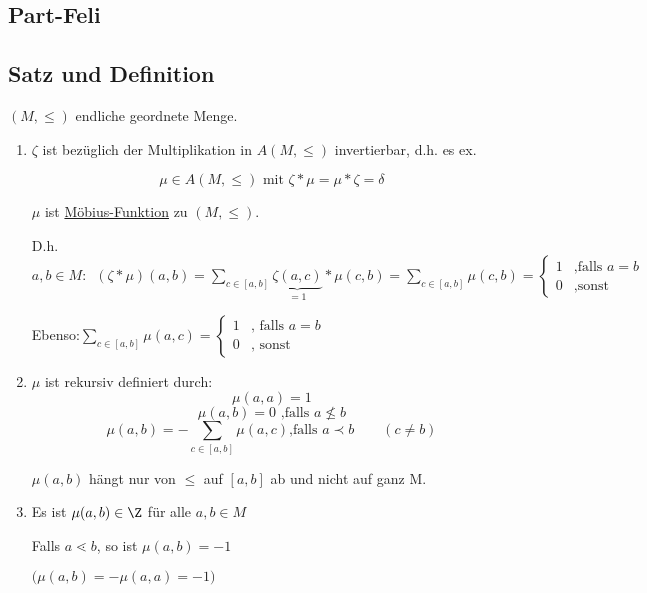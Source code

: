 \subsection{Part-Feli}

\subsection{Satz und Definition}
$(M,\leq)$ endliche geordnete Menge.
\begin{enumerate}
	

\item $\zeta$ ist bezüglich der Multiplikation in $A(M,\leq)$ invertierbar, d.h. es ex.

$$ \mu \in A(M,\leq) \text{ mit } \zeta * \mu = \mu * \zeta = \delta$$

$\mu$ ist \underline{Möbius-Funktion} zu $(M,\leq)$.

D.h. $a,b \in M: \enspace (\zeta * \mu)(a,b) = \sum_{c\in [a,b]} \underbrace{\zeta(a,c)}_{=1}*\mu(c,b) = \sum_{c \in [a,b]}\mu(c,b) =\begin{cases}
1& \text{,falls } a=b\\
0& \text{,sonst}
\end{cases}$

Ebenso:$ \sum_{c \in [a,b]}\mu(a,c)= \begin{cases}
1&\text{, falls }a=b\\
0& \text{, sonst}
\end{cases}$


\item $\mu$ ist rekursiv definiert durch:
$$\mu(a,a) =1$$
$$\mu(a,b) = 0 \text{ ,falls } a\nleq b$$
$$\mu(a,b) = -\sum_{c\in [a,b]}\mu(a,c) \text{,falls } a\prec b \qquad(c\neq b)$$

$\mu(a,b)$ hängt nur von $\leq$ auf $[a,b]$ ab und nicht auf ganz M.

\item Es ist $\mu(a,b) \in \Z$ für alle $a,b \in M$

Falls $a \lessdot b$, so ist $\mu(a,b) = -1$

$\Big(\mu(a,b)=-\mu(a,a)=-1\Big)$
\end{enumerate}
